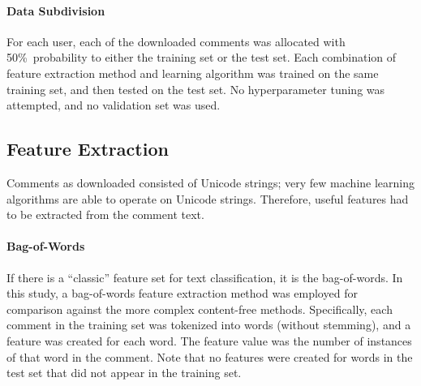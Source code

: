 \documentclass[12pt]{article}
\begin{document}
\paragraph{Data Subdivision}
For each user, each of the downloaded comments was allocated with 50\%~probability to either the training set or the test set. Each combination of feature extraction method and learning algorithm was trained on the same training set, and then tested on the test set. No hyperparameter tuning was attempted, and no validation set was used.

\subsection{Feature Extraction}
Comments as downloaded consisted of Unicode strings; very few machine learning algorithms are able to operate on Unicode strings. Therefore, useful features had to be extracted from the comment text.

\paragraph{Bag-of-Words}
If there is a ``classic'' feature set for text classification, it is the bag-of-words. In this study, a bag-of-words feature extraction method was employed for comparison against the more complex content-free methods. Specifically, each comment in the training set was tokenized into words (without stemming), and a feature was created for each word. The feature value was the number of instances of that word in the comment. Note that no features were created for words in the test set that did not appear in the training set. 
\end{document}
